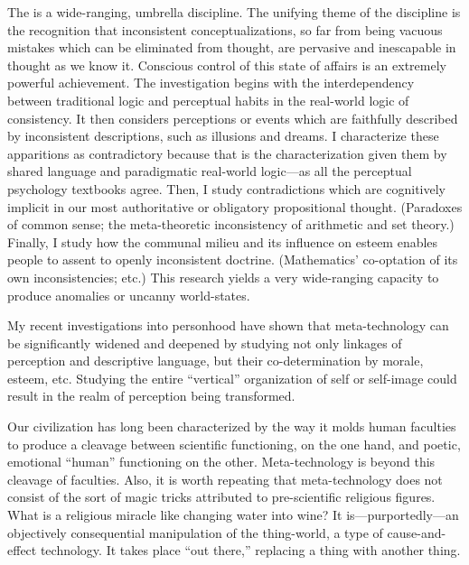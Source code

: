 The  is a wide-ranging, umbrella discipline. The unifying 
theme of the discipline is the recognition that inconsistent conceptualizations, so 
far from being vacuous mistakes which can be eliminated from thought, are 
pervasive and inescapable in thought as we know it. Conscious control of this state 
of affairs is an extremely powerful achievement. The investigation begins with the 
interdependency between traditional logic and perceptual habits in the real-world 
logic of consistency. It then considers perceptions or events which are faithfully 
described by inconsistent descriptions, such as illusions and dreams. I characterize 
these apparitions as contradictory because that is the characterization given them 
by shared language and paradigmatic real-world logic---as all the perceptual 
psychology textbooks agree. Then, I study contradictions which are cognitively 
implicit in our most authoritative or obligatory propositional thought. (Paradoxes of 
common sense; the meta-theoretic inconsistency of arithmetic and set theory.) 
Finally, I study how the communal milieu and its influence on esteem enables 
people to assent to openly inconsistent doctrine. (Mathematics' co-optation of its 
own inconsistencies; etc.) This research yields a very wide-ranging capacity to 
produce anomalies or uncanny world-states. 

{\sloppy My recent investigations into personhood have shown that meta-technology can 
be significantly widened and deepened by studying not only linkages of perception 
and descriptive language, but their co-determination by morale, esteem, etc. 
Studying the entire \enquote{vertical} organization of self or self-image could result in the 
realm of perception being transformed.\par}

\visbreak

Our civilization has long been characterized by the way it molds human faculties 
to produce a cleavage between scientific functioning, on the one hand, and poetic, 
emotional \enquote{human} functioning on the other. Meta-technology is beyond this 
cleavage of faculties. Also, it is worth repeating that meta-technology does not 
consist of the sort of magic tricks attributed to pre-scientific religious figures. What 
is a religious miracle like changing water into wine? It is---purportedly---an objectively 
consequential manipulation of the thing-world, a type of cause-and-effect 
technology. It takes place \enquote{out there,} replacing a thing with another thing. 

